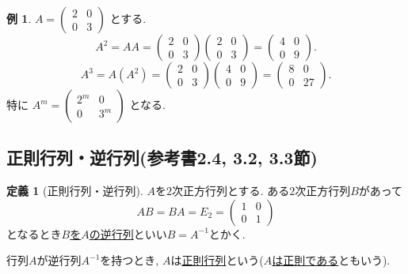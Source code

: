 \documentclass[dvipdfmx,a4paper,11pt]{article}
\theoremstyle{definition}
\newtheorem{dfn}[thm]{定義}
\newtheorem{exa}[thm]{例}
\begin{document}
  \begin{exa}
  $ A= 
 \begin{pmatrix}
2& 0\\
0 & 3
 \end{pmatrix}
$ とする. 
 $$
 A^2 =
 AA 
 =
 \begin{pmatrix}
2& 0\\
0 & 3
 \end{pmatrix}
 \begin{pmatrix}
2& 0\\
0 & 3
 \end{pmatrix}
 =  
 \begin{pmatrix}
4& 0\\
0 & 9
 \end{pmatrix}.
 $$
  $$
 A^3 =
 A(A^2) 
 =
 \begin{pmatrix}
2& 0\\
0 & 3
 \end{pmatrix}
 \begin{pmatrix}
4& 0\\
0 & 9
 \end{pmatrix}
 =  
 \begin{pmatrix}
8& 0\\
0 & 27
 \end{pmatrix}.
 $$
特に
  $
 A^m 
 =
 \begin{pmatrix}
2^m& 0\\
0 & 3^m
 \end{pmatrix}
 $
 となる. 


 \end{exa}

\subsection{正則行列・逆行列(参考書2.4, 3.2, 3.3節)}

\begin{tcolorbox}[
    colback = white,
    colframe = green!35!black,
    fonttitle = \bfseries,
    breakable = true]
    \begin{dfn}[正則行列・逆行列]
$A$を$2$次正方行列とする.
 ある$2$次正方行列$B$があって
 $$
 AB =BA =E_{2}
 = 
  \begin{pmatrix}
1& 0\\
0 &1
 \end{pmatrix}%
 $$
 となるとき\underline{$B$を$A$の逆行列}といい$B=A^{-1}$とかく.
 
 行列$A$が逆行列$A^{-1}$を持つとき, $A$は\underline{正則行列}という(\underline{$A$は正則である}ともいう).
  \end{dfn}
 \end{tcolorbox}
 
\end{document}
